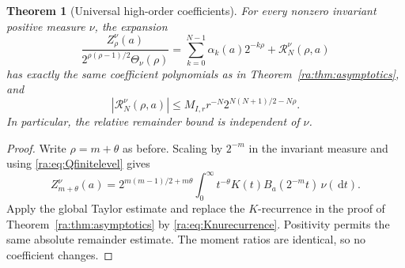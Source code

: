 \documentclass[11pt,a4paper,oneside,openany]{book}
\numberwithin{equation}{chapter}
\newtheorem{theorem}{Theorem}[chapter]
\theoremstyle{definition}
\theoremstyle{remark}
\newcommand{\dd}{\,\mathrm d}
\newcommand{\W}{K}
\begin{document}
\begin{theorem}[Universal high-order coefficients]\label{ra:thm:universal}
For every nonzero invariant positive measure $\nu$, the expansion
\begin{equation}\label{ra:eq:universalexp}
 \frac{Z_\rho^\nu(a)}{2^{\rho(\rho-1)/2}\Theta_\nu(\rho)}
 =\sum_{k=0}^{N-1}\alpha_k(a)2^{-k\rho}+\mathcal R_N^\nu(\rho,a)
\end{equation}
has exactly the same coefficient polynomials as in
Theorem~\ref{ra:thm:asymptotics}, and
\begin{equation}\label{ra:eq:universalremainder}
 |\mathcal R_N^\nu(\rho,a)|
 \le M_{I,r}r^{-N}2^{N(N+1)/2-N\rho}.
\end{equation}
In particular, the relative remainder bound is independent of $\nu$.
\end{theorem}
\begin{proof}
Write $\rho=m+\theta$ as before. Scaling by $2^{-m}$ in the invariant
measure and using \eqref{ra:eq:Qfinitelevel} gives
\[
 Z_{m+\theta}^\nu(a)
 =2^{m(m-1)/2+m\theta}
   \int_0^\infty t^{-\theta}\W(t)B_a(2^{-m}t)\,\nu(\dd t).
\]
Apply the global Taylor estimate and replace the $K$-recurrence in the
proof of Theorem~\ref{ra:thm:asymptotics} by
\eqref{ra:eq:Knurecurrence}. Positivity permits the same absolute remainder
estimate. The moment ratios are identical, so no coefficient changes.
\end{proof}
\end{document}
